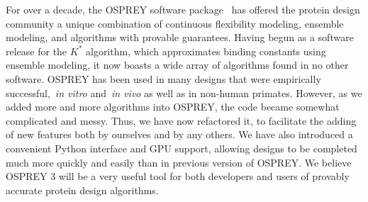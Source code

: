 For over a decade, the OSPREY software package~\cite{OSPREY,OSPREY_MIE} has offered the protein design community a unique combination of continuous flexibility modeling, ensemble modeling, and algorithms with provable guarantees.  Having begun as a software release for the $K^*$ algorithm, which approximates binding constants using ensemble modeling, it now boasts a wide array of algorithms found in no other software.  OSPREY has been used in many designs that were empirically successful,~\textit{in vitro} and~\textit{in vivo} as well as in non-human primates.  However, as we added more and more algorithms into OSPREY, the code became somewhat complicated and messy.  Thus, we have now refactored it, to facilitate the adding of new features both by ourselves and by any others.  We have also introduced a convenient Python interface and GPU support, allowing designs to be completed much more quickly and easily than in previous version of OSPREY.  We believe OSPREY 3 will be a very useful tool for both developers and users of provably accurate protein design algorithms.  